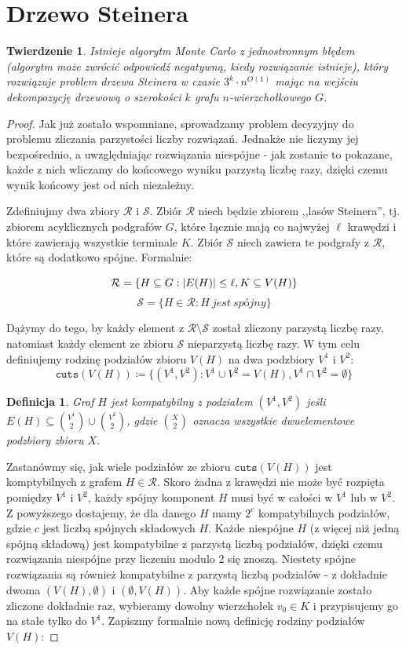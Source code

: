 \documentclass[12pt, oneside]{report}
\newtheorem{theorem}{Twierdzenie}
\newtheorem{definition}{Definicja}
\newcommand\Omicron{O}
\begin{document}
    	\section{Drzewo Steinera}


\begin{theorem}
\label{monte_carlo}
\em Istnieje algorytm Monte Carlo z jednostronnym błędem (algorytm może zwrócić odpowiedź negatywną, kiedy rozwiązanie istnieje), który rozwiązuje problem drzewa Steinera w czasie $3^k \cdot n^{\Omicron(1)}$ mając na wejściu dekompozycję drzewową o szerokości $k$ grafu $n$-wierzchołkowego $G$.
\end{theorem}

\begin{proof}
Jak już zostało wspomniane, sprowadzamy problem decyzyjny do problemu zliczania parzystości liczby rozwiązań. Jednakże nie liczymy jej bezpośrednio, a uwzględniając rozwiązania niespójne - jak zostanie to pokazane, każde z nich wliczamy do końcowego wyniku parzystą liczbę razy, dzięki czemu wynik końcowy jest od nich niezależny.

Zdefiniujmy dwa zbiory $\mathcal{R}$ i $\mathcal{S}$. Zbiór $\mathcal{R}$ niech będzie zbiorem ,,lasów Steinera'', tj. zbiorem acyklicznych podgrafów $G$, które łącznie mają co najwyżej $\ell$ krawędzi i które zawierają wszystkie terminale $K$. Zbiór $\mathcal{S}$ niech zawiera te podgrafy z $\mathcal{R}$, które są dodatkowo spójne. Formalnie:

$$\mathcal{R} = \{H \subseteq G: \abs{E(H)} \leq \ell, K \subseteq V(H)\}$$
$$\mathcal{S} = \{H \in \mathcal{R}: H\ jest\ sp\mbox{ó}jny\}$$

Dążymy do tego, by każdy element z $\mathcal{R} \setminus \mathcal{S}$ został zliczony parzystą liczbę razy, natomiast każdy element ze zbioru $\mathcal{S}$ nieparzystą liczbę razy. W tym celu definiujemy rodzinę podziałów zbioru $V(H)$ na dwa podzbiory $V^1$ i $V^2$:
$$\texttt{cuts} (V(H)) \coloneqq \{(V^1, V^2): V^1 \cup V^2 = V(H), V^1 \cap V^2 = \emptyset\}$$
\begin{definition}
\em \emph{Graf $H$ jest kompatybilny z podziałem $(V^1, V^2)$} jeśli $E(H) \subseteq {V^1 \choose 2} \cup {V^2 \choose 2}$, gdzie ${X \choose 2}$ oznacza wszystkie dwuelementowe podzbiory zbioru $X$.  
\end{definition}

Zastanówmy się, jak wiele podziałów ze zbioru $\texttt{cuts} (V(H))$ jest komptybilnych z grafem $H \in \mathcal{R}$. Skoro żadna z krawędzi nie może być rozpięta pomiędzy $V^1$ i $V^2$, każdy spójny komponent $H$ musi być w całości w $V^1$ lub w $V^2$. Z powyższego dostajemy, że dla danego $H$ mamy $2^c$ kompatybilnych podziałów, gdzie $c$ jest liczbą spójnych składowych $H$. Każde niespójne $H$ (z więcej niż jedną spójną składową) jest kompatybilne z parzystą liczbą podziałów, dzięki czemu rozwiązania niespójne przy liczeniu modulo 2 się znoszą. Niestety spójne rozwiązania są również kompatybilne z parzystą liczbą podziałów - z dokładnie dwoma $(V(H), \emptyset)$ i $(\emptyset, V(H))$. Aby każde spójne rozwiązanie zostało zliczone dokładnie raz, wybieramy dowolny wierzchołek $v_0 \in K$ i przypisujemy go na stałe tylko do $V^1$. Zapiszmy formalnie nową definicję rodziny podziałów $V(H)$:


\end{proof}
\end{document}
